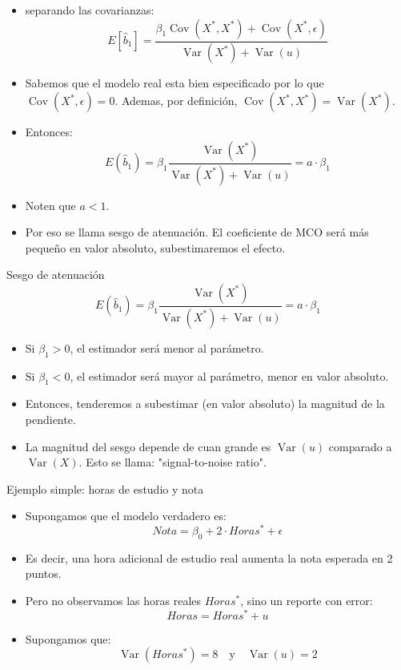 \documentclass[10pt]{beamer}
\begin{document}
\begin{frame}
    \begin{itemize}
        \item separando las covarianzas:
        $$
        E\left[\hat{b}_{1}\right]=\frac{\beta_{1} \operatorname{Cov}\left(X^{*}, X^{*}\right)+\operatorname{Cov}\left(X^{*}, \epsilon\right)}{\operatorname{Var}\left(X^{*}\right)+\operatorname{Var}(u)}
        $$
        \item Sabemos que el modelo real esta bien especificado por lo que $\operatorname{Cov}\left(X^{*}, \epsilon\right)=0$. Ademas, por definici\'on, $\operatorname{Cov}\left(X^{*}, X^{*}\right)=\operatorname{Var}\left(X^{*}\right)$.
        \item Entonces:
        $$
        E\left(\hat{b}_{1}\right)=\beta_{1} \frac{\operatorname{Var}\left(X^{*}\right)}{\operatorname{Var}\left(X^{*}\right)+\operatorname{Var}(u)}=a \cdot \beta_{1}
        $$
        \item Noten que $a<1$.
        \item Por eso se llama sesgo de atenuaci\'on. El coeficiente de MCO ser\'a m\'as pequeño en valor absoluto, subestimaremos el efecto.
    \end{itemize}
\end{frame}

\begin{frame}{Sesgo de atenuación}
    $$
    E\left(\hat{b}_{1}\right)=\beta_{1} \frac{\operatorname{Var}\left(X^{*}\right)}{\operatorname{Var}\left(X^{*}\right)+\operatorname{Var}(u)}=a \cdot\beta_{1}
    $$
    \begin{itemize}
        \item Si $\beta_{1}>0$, el estimador será menor al par\'ametro.
        \item Si $\beta_{1}<0$, el estimador será mayor al par\'ametro, menor en valor absoluto.
        \item Entonces, tenderemos a subestimar (en valor absoluto) la magnitud de la pendiente.
        \item La magnitud del sesgo depende de cuan grande es $\operatorname{Var}(u)$ comparado a $\operatorname{Var}(X)$. Esto se llama: "signal-to-noise ratio".
    \end{itemize}
\end{frame}

\begin{frame}{Ejemplo simple: horas de estudio y nota}
    \begin{itemize}
        \item Supongamos que el modelo verdadero es:
        $$
        Nota=\beta_{0}+2\cdot Horas^{*}+\epsilon
        $$
        \item Es decir, una hora adicional de estudio real aumenta la nota esperada en 2 puntos.
        \item Pero no observamos las horas reales $Horas^{*}$, sino un reporte con error:
        $$
        Horas=Horas^{*}+u
        $$
        \item Supongamos que:
        $$
        \operatorname{Var}(Horas^{*})=8 \quad \text{y} \quad \operatorname{Var}(u)=2
        $$
    \end{itemize}
\end{frame}
\end{document}
